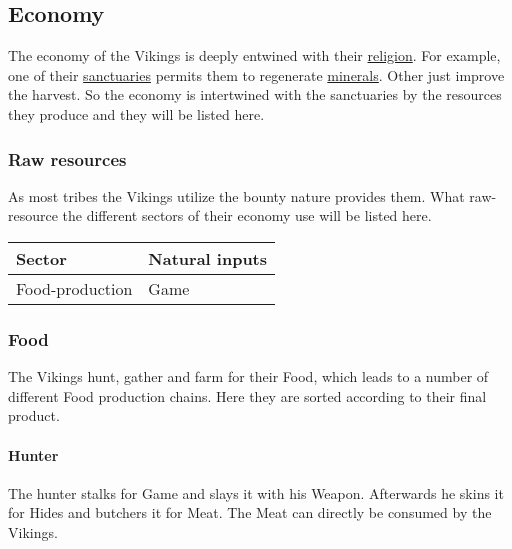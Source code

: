 \subsection{Economy}\label{ch:Tribes:Vikings:Economy}
The economy of the \gls*{Vikings} is deeply entwined with their
\hyperref[ch:Tribes:Vikings:Religion]{religion}. For example, one of their
\hyperref[ch:Tribes:Vikings:Religion:Mountain]{sanctuaries} permits them to
regenerate \hyperref[ch:Goods:Nature:Minerals]{minerals}. Other just improve
the harvest. So the economy is intertwined with the sanctuaries by the
resources they produce and they will be listed here.

\subsubsection{Raw resources}\label{ch:Tribes:Vikings:Ecnonmy:RawInputs}
As most tribes the \gls*{Vikings} utilize the bounty nature provides them. What
raw-resource the different sectors of their economy use will be listed here.

\begin{longtable}{ll}
	\toprule
	Sector                & Natural inputs \\
	\midrule
	\Gls{Food}-production & \Gls{Game}     \\
	\bottomrule
\end{longtable}

\subsubsection{Food}
The \gls*{Vikings} hunt, gather and farm for their \gls{Food}, which leads to a
number of different \gls{Food} production chains. Here they are sorted
according to their final product.

\paragraph{Hunter}
The hunter stalks for \gls{Game} and slays it with his \gls{Weapon}. Afterwards
he skins it for \glspl{Hide} and butchers it for \gls{Meat}. The \gls{Meat} can
directly be consumed by the \gls{Vikings}.

